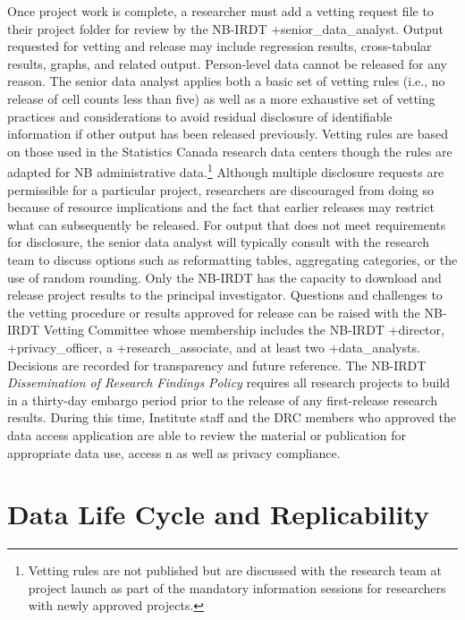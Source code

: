 \documentclass[
]{book}
\begin{document}
Once project work is complete, a researcher must add a vetting request file to their project folder for review by the NB-IRDT +senior\_data\_analyst\textbar. Output requested for vetting and release may include regression results, cross-tabular results, graphs, and related output. Person-level data cannot be released for any reason. The senior data analyst applies both a basic set of vetting rules (i.e., no release of cell counts less than five) as well as a more exhaustive set of vetting practices and considerations to avoid residual disclosure of identifiable information if other output has been released previously. Vetting rules are based on those used in the Statistics Canada research data centers though the rules are adapted for NB administrative data.\footnote{Vetting rules are not published but are discussed with the research team at project launch as part of the mandatory information sessions for researchers with newly approved projects.} Although multiple disclosure requests are permissible for a particular project, researchers are discouraged from doing so because of resource implications and the fact that earlier releases may restrict what can subsequently be released. For output that does not meet requirements for disclosure, the senior data analyst will typically consult with the research team to discuss options such as reformatting tables, aggregating categories, or the use of random rounding. Only the NB-IRDT has the capacity to download and release project results to the principal investigator. Questions and challenges to the vetting procedure or results approved for release can be raised with the NB-IRDT Vetting Committee whose membership includes the NB-IRDT +director\textbar, +privacy\_officer\textbar, a +research\_associate\textbar, and at least two +data\_analysts\textbar. Decisions are recorded for transparency and future reference. The NB-IRDT \emph{Dissemination of Research Findings Policy} requires all research projects to build in a thirty-day embargo period prior to the release of any first-release research results. During this time, Institute staff and the DRC members who approved the data access application are able to review the material or publication for appropriate data use, access n as well as privacy compliance.

\hypertarget{data-life-cycle-and-replicability-1}{%
\section{Data Life Cycle and Replicability}\label{data-life-cycle-and-replicability-1}}
\end{document}

